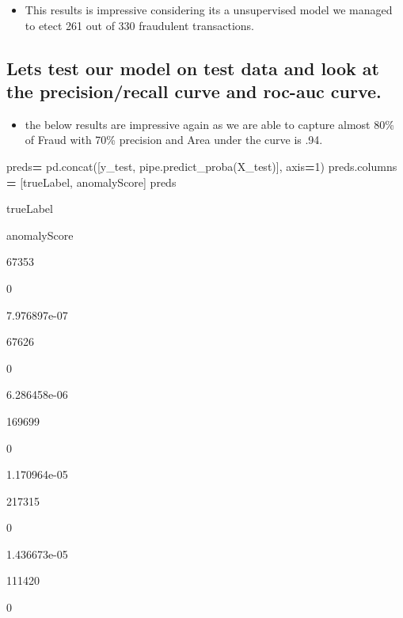\documentclass[
]{article}
\newenvironment{Shaded}{\begin{snugshade}}{\end{snugshade}}
\newcommand{\DecValTok}[1]{\textcolor[rgb]{0.00,0.00,0.81}{#1}}
\newcommand{\NormalTok}[1]{#1}
\newcommand{\OperatorTok}[1]{\textcolor[rgb]{0.81,0.36,0.00}{\textbf{#1}}}
\newcommand{\StringTok}[1]{\textcolor[rgb]{0.31,0.60,0.02}{#1}}
\providecommand{\tightlist}{%
  \setlength{\itemsep}{0pt}\setlength{\parskip}{0pt}}
\begin{document}
\begin{itemize}
\tightlist
\item
  This results is impressive considering its a unsupervised model we
  managed to etect 261 out of 330 fraudulent transactions.
\end{itemize}

\hypertarget{lets-test-our-model-on-test-data-and-look-at-the-precisionrecall-curve-and-roc-auc-curve.}{%
\subsection{Lets test our model on test data and look at the
precision/recall curve and roc-auc
curve.}\label{lets-test-our-model-on-test-data-and-look-at-the-precisionrecall-curve-and-roc-auc-curve.}}

\begin{itemize}
\tightlist
\item
  the below results are impressive again as we are able to capture
  almost 80\% of Fraud with 70\% precision and Area under the curve is
  .94.
\end{itemize}

\begin{Shaded}
\begin{Highlighting}[]
\NormalTok{preds}\OperatorTok{=}\NormalTok{ pd.concat([y\_test, pipe.predict\_proba(X\_test)], axis}\OperatorTok{=}\DecValTok{1}\NormalTok{)}
\NormalTok{preds.columns }\OperatorTok{=}\NormalTok{ [}\StringTok{\textquotesingle{}trueLabel\textquotesingle{}}\NormalTok{, }\StringTok{\textquotesingle{}anomalyScore\textquotesingle{}}\NormalTok{]}
\NormalTok{preds}
\end{Highlighting}
\end{Shaded}

trueLabel

anomalyScore

67353

0

7.976897e-07

67626

0

6.286458e-06

169699

0

1.170964e-05

217315

0

1.436673e-05

111420

0
\end{document}
